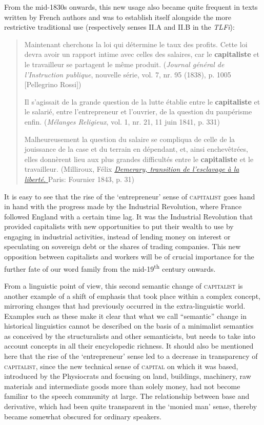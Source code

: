 \documentclass[output=paper]{langsci/langscibook}
\begin{document}
From the mid-1830s onwards, this new usage also became quite frequent  in
texts written by French authors and was to establish itself alongside the
more restrictive traditional use (respectively senses II.A and II.B in
the \emph{TLFi}):

\begin{quote}
Maintenant cherchons la loi qui détermine le taux des profits. Cette loi
devra avoir un rapport intime avec celles des salaires, car le
\textbf{capitaliste} et le travailleur se partagent le même produit.
(\emph{Journal général de l'Instruction publique}, nouvelle série, vol.
7, nr. 95 (1838), p. 1005 {[}Pellegrino Rossi{]})

Il s'agissait de la grande question de la lutte établie entre le
\textbf{capitaliste} et le salarié, entre l'entrepreneur et l'ouvrier,
de la question du paupérisme enfin. (\emph{Mélanges Religieux}, vol. 1,
nr. 21, 11 juin 1841, p. 331)

Malheureusement la question du salaire se compliqua de celle de la
jouissance de la case et du terrain en dépendant, et, ainsi
enchevêtrées, elles donnèrent lieu aux plus grandes difficultés entre le
\textbf{capitaliste} et le travailleur. (Milliroux, Félix
\href{https://books.google.at/books?id=FwsUAAAAIAAJ\&pg=PA31\&dq=\%22capitaliste
\%22\&hl=de\&sa=X\&ved=0ahUKEwjT0cOwhpbOAhXGvhQKHUD0Cx84KBDoAQgoMAI}{\emph{
Demerary,
transition de l'esclavage à la liberté. }}Paris: Fournier 1843, p. 31)
\end{quote}

It is easy to see that the rise of the `entrepreneur' sense of
\textsc{capitalist} goes hand in hand with the progress made by the
Industrial Revolution, where France followed England with a certain time
lag. It was the Industrial Revolution that provided capitalists with new
opportunities to put their wealth to use by engaging in industrial
activities, instead of lending money on interest or speculating on
sovereign debt or the shares of trading companies. This new opposition
between capitalists and workers will be of crucial importance for the
further fate of our word family from the mid-19\textsuperscript{th}
century onwards.

From a linguistic point of view, this second semantic change of
\textsc{capitalist} is another example of a shift of emphasis that took
place within a complex concept, mirroring changes that had previously
occurred in the extra-linguistic world. Examples such as these make it
clear that what we call ``semantic'' change in historical linguistics
cannot be described on the basis of a minimalist semantics as conceived
by the structuralists and other semanticists, but needs to take into
account concepts in all their encyclopedic richness. It should also be
mentioned here that the rise of the `entrepreneur' sense led to a
decrease in transparency of \textsc{capitalist}, since the new technical
sense of \textsc{capital} on which it was based, introduced by the
Physiocrats and focusing on land, buildings, machinery, raw materials
and intermediate goods more than solely money, had not become familiar
to the speech community at large. The relationship between base and
derivative, which had been quite transparent in the `monied man' sense,
thereby became somewhat obscured for ordinary speakers.
\end{document}
